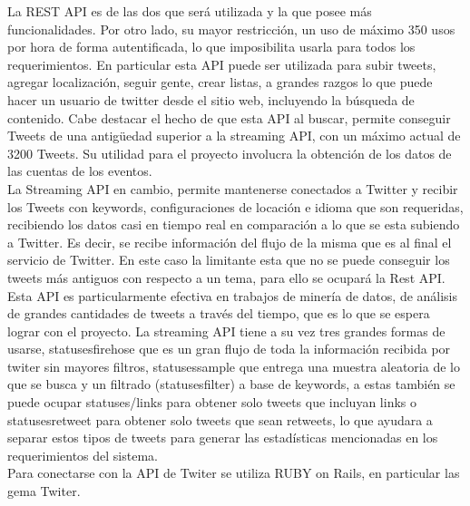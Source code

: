 \documentclass{memoria}
\begin{document}
La REST API es de las dos que será utilizada y la que posee más funcionalidades. Por otro lado, su mayor restricción, un uso de máximo 350 usos por hora de forma autentificada, lo que imposibilita usarla para todos los requerimientos. En particular esta API puede ser utilizada para subir tweets, agregar localización, seguir gente, crear listas, a grandes razgos lo que puede hacer un usuario de twitter desde el sitio web, incluyendo la búsqueda de contenido. Cabe destacar el hecho de que esta API al buscar, permite conseguir Tweets de una antigüedad superior a la streaming API, con un máximo actual de 3200 Tweets. Su utilidad para el proyecto involucra la obtención de los datos de las cuentas de los eventos.\\

La Streaming API en cambio, permite mantenerse conectados a Twitter y recibir los Tweets con keywords, configuraciones de locación e idioma que son requeridas, recibiendo los datos casi en tiempo real en comparación a lo que se esta subiendo a Twitter. Es decir, se recibe información del flujo de la misma que es al final el servicio de Twitter. En este caso la limitante esta que no se puede conseguir los tweets más antiguos con respecto a un tema, para ello se ocupará la Rest API. Esta API es particularmente efectiva en trabajos de minería de datos, de análisis de grandes cantidades de tweets a través del tiempo, que es lo que se espera lograr con el proyecto.
La streaming API tiene a su vez tres grandes formas de usarse, statuses\/firehose que es un gran flujo de toda la información recibida por twiter sin mayores filtros, statuses\/sample que entrega una muestra aleatoria de lo que se busca y un filtrado (statuses\/filter)  a base de keywords, a estas también se puede ocupar statuses/links para obtener solo tweets que incluyan links o statuses\/retweet para obtener solo tweets que sean retweets, lo que ayudara a separar estos tipos de tweets para generar las estadísticas mencionadas en los requerimientos del sistema.\\
Para conectarse con la API de Twiter se utiliza RUBY on Rails, en particular las gema Twiter.
\end{document}
